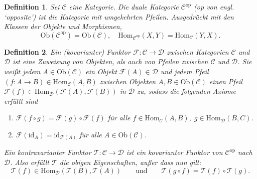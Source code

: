 \documentclass[a4paper, 11pt]{scrartcl}
\newcommand{\Hom}{\text{Hom}}
\newcommand{\id}{\text{id}}
\newcommand{\Ob}{\text{Ob}}
\theoremstyle{basicstyle}
\newtheorem{definition}{Definition}[section]
\begin{document}
    \begin{definition}
        Sei \(\mathcal{C}\) eine Kategorie.
        Die \emph{duale Kategorie} \(\mathcal{C}^{\text{op}}\) (op von engl. `opposite') ist die Kategorie mit umgekehrten Pfeilen.
        Ausgedrückt mit den Klassen der Objekte und Morphismen,
        \[\Ob(\mathcal{C}^{\text{op}}) = \Ob(\mathcal{C}), \quad \Hom_{\mathcal{C}^{\text{op}}}(X, Y) = \Hom_{\mathcal{C}}(Y, X).\]
    \end{definition}

    \begin{definition}
        Ein \emph{(kovarianter) Funktor} \(\mathcal{F}: \mathcal{C} \to \mathcal{D}\) zwischen Kategorien \(\mathcal{C}\) und \(\mathcal{D}\) ist eine Zuweisung von Objekten, als auch von Pfeilen zwischen \(\mathcal{C}\) und \(\mathcal{D}\).
        Sie weißt jedem \(A \in \Ob(\mathcal{C})\) ein Objekt \(\mathcal{F}(A) \in \mathcal{D}\) und jedem Pfeil \((f: A \to B) \in \Hom_\mathcal{C}(A, B)\) zwischen Objekten \(A, B \in \Ob(\mathcal{C})\) einen Pfeil \(\mathcal{F}(f) \in \Hom_{\mathcal{D}}(\mathcal{F}(A), \mathcal{F}(B))\) in \(\mathcal{D}\) zu, sodass die folgenden Axiome erfüllt sind
        \begin{enumerate}
            \item \(\mathcal{F}(f \circ g) = \mathcal{F}(g) \circ \mathcal{F}(f)\) für alle \(f \in \Hom_{\mathcal{C}}(A, B), \; g \in \Hom_{\mathcal{D}}(B, C)\).
            \item \(\mathcal{F}(\id_A) = \id_{\mathcal{F}(A)}\) für alle \(A \in \Ob(\mathcal{C})\).
        \end{enumerate}
        Ein \emph{kontravarianter Funktor} \(\mathcal{T}: \mathcal{C} \to \mathcal{D}\) ist ein kovarianter Funktor von \(\mathcal{C}^{\text{op}}\) nach \(\mathcal{D}\).
        Also erfüllt \(\mathcal{T}\) die obigen Eigenschaften, außer dass nun gilt:
        \[\mathcal{T}(f) \in \Hom_{\mathcal{D}}(\mathcal{T}(B), \mathcal{T}(A)) \qquad\text{und}\qquad \mathcal{T}(g \circ f) = \mathcal{T}(f) \circ \mathcal{T}(g).\]
    \end{definition}
\end{document}
